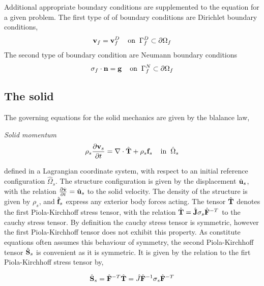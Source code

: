 Additional appropriate boundary conditions are supplemented to the equation for a given problem. The first type of of boundary conditions are Dirichlet boundary conditions, 
\begin{align}
\mathbf{v}_f = \mathbf{v}_f^D 
\hspace{4mm} \text{on} \hspace{2mm} \Gamma_f^D \subset \partial \Omega_f 
\end{align}
The second type of boundary condition are Neumann boundary conditions
\begin{align}
\sigma_f \cdot \mathbf{n} = \mathbf{g} 
\hspace{4mm} \text{on} \hspace{2mm} \Gamma_f^N \subset \partial \Omega_f 
\end{align}

\newpage
\subsection{The solid}
The governing equations for the solid mechanics are given by the blalance law,
\begin{equat}
\textit{Solid momentum}
\begin{align}
\rho_s \frac{\partial \mathbf{v}_s}{\partial t} = \nabla \cdot \hat{\mathbf{T}} + \rho_s \mathbf{f}_s
\hspace{4mm} \text{in} \hspace{2mm} \hat{\Omega}_s
\end{align}
\end{equat}
defined in a Lagrangian coordinate system, with respect to an initial reference configuration $\hat{\Omega}_s$. The structure configuration is given by the displacement $\hat{\mathbf{u}}_s$, with the relation
 $\frac{\partial \hat{\mathbf{v}}}{\partial t} = \hat{\mathbf{u}}_s$ to the solid velocity. The density of the structure is given by $\rho_s$, and $\hat{\mathbf{f}}_s$ express any exterior body forces acting. The tensor $\hat{\mathbf{T}}$ denotes the first Piola-Kirchhoff stress tensor, with the relation $\hat{\mathbf{T}}  = \hat{\mathbf{J}} \sigma_s \hat{\mathbf{F}}^{-T}$ to the cauchy stress tensor. By definition the cauchy stress tensor is symmetric, however the first Piola-Kirchhoff tensor does not exhibit this property. As constitute equations often assumes this behaviour of symmetry, the second Piola-Kirchhoff tensor $\hat{\mathbf{S}}_s$ is convenient as it is symmetric.  It is given by the relation to the firt Piola-Kirchhoff stress tensor by, 
 
 \begin{align*}
 \hat{\mathbf{S}}_s = \hat{\mathbf{F}}^{-T} \hat{\mathbf{T}} = \hat{J} \hat{\mathbf{F}}^{-1} \sigma_s \hat{\mathbf{F}}^{-T}
 \end{align*}
 
